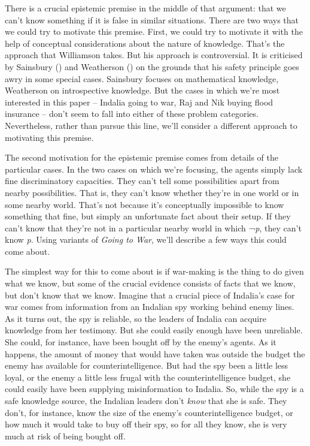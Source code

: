 \documentclass[
  11pt,
  letterpaper,
  DIV=11,
  numbers=noendperiod,
  twoside]{scrartcl}
\begin{document}
There is a crucial epistemic premise in the middle of that argument:
that we can't know something if it is false in similar situations. There
are two ways that we could try to motivate this premise. First, we could
try to motivate it with the help of conceptual considerations about the
nature of knowledge. That's the approach that Williamson takes. But his
approach is controversial. It is criticised by Sainsbury
() and Weatherson
() on the grounds that his
safety principle goes awry in some special cases. Sainsbury focuses on
mathematical knowledge, Weatherson on introspective knowledge. But the
cases in which we're most interested in this paper -- Indalia going to
war, Raj and Nik buying flood insurance -- don't seem to fall into
either of these problem categories. Nevertheless, rather than pursue
this line, we'll consider a different approach to motivating this
premise.

The second motivation for the epistemic premise comes from details of
the particular cases. In the two cases on which we're focusing, the
agents simply lack fine discriminatory capacities. They can't tell some
possibilities apart from nearby possibilities. That is, they can't know
whether they're in one world or in some nearby world. That's not because
it's conceptually impossible to know something that fine, but simply an
unfortunate fact about their setup. If they can't know that they're not
in a particular nearby world in which ¬\emph{p}, they can't know
\emph{p}. Using variants of \emph{Going to War}, we'll describe a few
ways this could come about.

The simplest way for this to come about is if war-making is the thing to
do given what we know, but some of the crucial evidence consists of
facts that we know, but don't know that we know. Imagine that a crucial
piece of Indalia's case for war comes from information from an Indalian
spy working behind enemy lines. As it turns out, the spy is reliable, so
the leaders of Indalia can acquire knowledge from her testimony. But she
could easily enough have been unreliable. She could, for instance, have
been bought off by the enemy's agents. As it happens, the amount of
money that would have taken was outside the budget the enemy has
available for counterintelligence. But had the spy been a little less
loyal, or the enemy a little less frugal with the counterintelligence
budget, she could easily have been supplying misinformation to Indalia.
So, while the spy is a safe knowledge source, the Indalian leaders don't
\emph{know} that she is safe. They don't, for instance, know the size of
the enemy's counterintelligence budget, or how much it would take to buy
off their spy, so for all they know, she is very much at risk of being
bought off.
\end{document}
